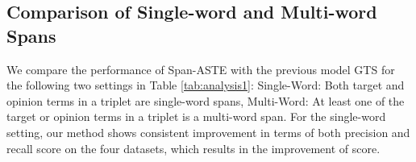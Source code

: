 \documentclass[11pt,a4paper]{article}
\begin{document}
\subsection{Comparison of Single-word and Multi-word Spans}
\label{ana:single_multi}
We compare the performance of 
Span-ASTE with the previous model GTS \cite{wu-etal-2020-grid} for the following two settings in Table \ref{tab:analysis1}:
Single-Word: Both target and opinion terms in a triplet are single-word spans,
Multi-Word: At least one of the target or opinion terms in a triplet is a multi-word span. 
For the single-word setting, our method shows consistent improvement in terms of both precision and recall score on the four datasets, which results in the improvement of  score.
\begin{table*}[!t]
\centering
\caption{Analysis with different evaluation modes on the ASTE task.}
\label{tab:analysis1}
\end{table*}
\end{document}

